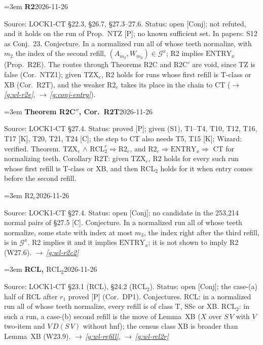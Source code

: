 \documentclass[11pt]{amsart}
\makeatletter
\newcommand{\Gc}{\mathcal G}
\newcounter{sense}
\newenvironment{entry}[3]{%
  \par\addvspace{\medskipamount}\noindent\phantomsection
  \def\@currentlabel{#2}\label{#1}\setcounter{sense}{0}\raggedright\emergencystretch=3em%
  \textbf{#2}\hfill{\footnotesize\textsf{#3}}\par\nopagebreak\noindent\ignorespaces}%
  {\par}
\newcommand{\src}[1]{\textsf{Source:} #1.\enskip}
\newcommand{\status}[1]{\textsf{Status:} #1.\enskip}
\newcommand{\appears}[1]{\textsf{In papers:} #1.\enskip}
\renewcommand{\see}[1]{$\rightarrow$\,\emph{\ref{#1}}}
\makeatother
\begin{document}
\begin{entry}{g:wl-r2}{R2}{2026-11-26}
\src{LOCK1-CT \S22.3, \S26.7, \S27.3--27.6}
\status{open [Conj]; not refuted, and it holds on the run of Prop.~NTZ [P]; no known sufficient set}
\appears{S12 as Conj.~23}
Conjecture. In a normalized run all of whose teeth normalize, with $m_2$ the index of the second refill,
$(A_{m_2},W_{m_2})\in\Gc^{x}$; R2 implies $\mathrm{ENTRY}_x$ (Prop.~R2E). The routes through Theorems R2C
and R2C$'$ are void, since TZ is false (Cor.~NTZ1); given TZX$_e$, R2 holds for runs whose first refill
is T-class or XB (Cor.~R2T), and the weaker $\mathrm{R2}_e$ takes its place in the chain to CT
(\see{g:wl-r2e}, \see{g:conj-entry}).
\end{entry}

\begin{entry}{g:wl-r2c2}{Theorem R2C$''$, Cor.~R2T}{2026-11-26}
\src{LOCK1-CT \S27.4}
\status{proved [P]; given (S1), T1--T4, T10, T12, T16, T17 [K], T20, T21, T24 [C]; the step to CT also
needs T5, T15 [K]; Wizard: verified}
Theorem. TZX$_e$ $\wedge$ $\mathrm{RCL}_2^{r}\Rightarrow\mathrm{R2}_e$, and $\mathrm{R2}_e\Rightarrow
\mathrm{ENTRY}_x\Rightarrow$ CT for normalizing teeth. Corollary R2T: given TZX$_e$, R2 holds for every
such run whose first refill is T-class or XB, and then $\mathrm{RCL}_2$ holds for it when entry comes
before the second refill.
\end{entry}

\begin{entry}{g:wl-r2e}{$\mathrm{R2}_e$}{2026-11-26}
\src{LOCK1-CT \S27.4}
\status{open [Conj]; no candidate in the 253,214 normal pairs of \S27.5 [C]}
Conjecture. In a normalized run all of whose teeth normalize, some state with index at most $m_3$, the
index right after the third refill, is in $\Gc^{x}$. R2 implies it and it implies $\mathrm{ENTRY}_x$;
it is not shown to imply R2 (W27.6). \see{g:wl-r2c2}
\end{entry}

\begin{entry}{g:wl-rcl}{RCL, $\mathrm{RCL}_2$}{2026-11-26}
\src{LOCK1-CT \S23.1 (RCL), \S24.2 ($\mathrm{RCL}_2$)}
\status{open [Conj]; the case-(a) half of RCL after $r_1$ proved [P] (Cor.~DP1)}
Conjectures. RCL: in a normalized run all of whose teeth normalize, every refill is of class T, SSc or
XB. $\mathrm{RCL}_2$: in such a run, a case-(b) second refill is the move of Lemma~XB ($X$ over $S\,V$
with $V$ two-item and $V\,D(S\,V)$ without hnf); the census class XB is broader than Lemma~XB (W23.9).
\see{g:wl-refill}, \see{g:wl-rcl2r}
\end{entry}
\end{document}
